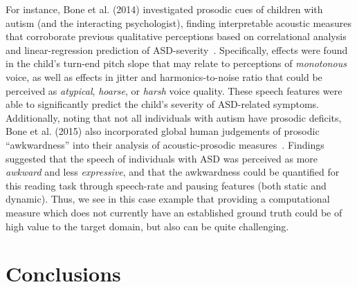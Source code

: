 \documentclass{article}
\begin{document}
For instance, Bone et al. (2014) investigated prosodic cues of children with autism (and the interacting psychologist), finding interpretable acoustic measures that corroborate previous qualitative perceptions based on correlational analysis and linear-regression prediction of ASD-severity~\cite{bone2014psychologist}. Specifically, effects were found in the child's turn-end pitch slope that may relate to perceptions of {\it monotonous} voice, as well as effects in jitter and harmonics-to-noise ratio that could be perceived as {\it atypical}, {\it hoarse}, or {\it harsh} voice quality. These speech features were able to significantly predict the child's severity of ASD-related symptoms. Additionally, noting that not all individuals with autism have prosodic deficits, Bone et al. (2015) also incorporated global human judgements of prosodic ``awkwardness'' into their analysis of acoustic-prosodic measures~\cite{bone2015acoustic}. Findings suggested that the speech of individuals with ASD was perceived as more {\it awkward} and less {\it expressive}, and that the awkwardness could be quantified for this reading task through speech-rate and pausing features (both static and dynamic). Thus, we see in this case example that providing a computational measure which does not currently have an established ground truth  could be of high value to the target domain, but also can be quite challenging.

\section{Conclusions}
\end{document}
